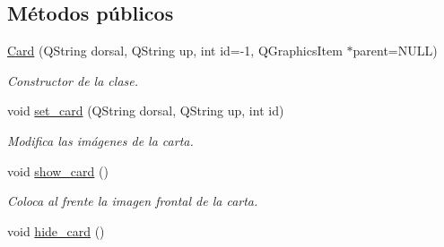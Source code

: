 \subsection*{Métodos públicos}
\begin{DoxyCompactItemize}
\item 
\hyperlink{classCard_a7340a365f3fbe880a434c68d7e665a33}{Card} (Q\-String dorsal, Q\-String up, int id=-\/1, Q\-Graphics\-Item $\ast$parent=N\-U\-L\-L)
\begin{DoxyCompactList}\small\item\em Constructor de la clase. \end{DoxyCompactList}\item 
void \hyperlink{classCard_a5ccb7a98359b49bdaac475e8b2129975}{set\-\_\-card} (Q\-String dorsal, Q\-String up, int id)
\begin{DoxyCompactList}\small\item\em Modifica las imágenes de la carta. \end{DoxyCompactList}\item 
\hypertarget{classCard_abbd46606b409c7981a9defb38c8a29b8}{void \hyperlink{classCard_abbd46606b409c7981a9defb38c8a29b8}{show\-\_\-card} ()}\label{classCard_abbd46606b409c7981a9defb38c8a29b8}

\begin{DoxyCompactList}\small\item\em Coloca al frente la imagen frontal de la carta. \end{DoxyCompactList}\item 
\hypertarget{classCard_ac9821ebe4235b9dac41055e58675a4a5}{void \hyperlink{classCard_ac9821ebe4235b9dac41055e58675a4a5}{hide\-\_\-card} ()}\label{classCard_ac9821ebe4235b9dac41055e58675a4a5}


\end{DoxyCompactItemize}
